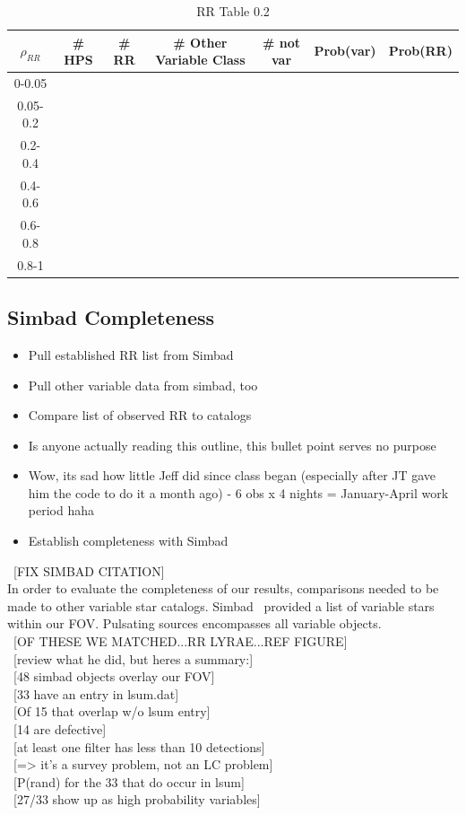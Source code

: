 \documentclass[aps,prb,twocolumn,superscriptaddress]{revtex4-1}
\begin{document}
\begin{table}[H]
	\begin{center}
		\begin{tabular}{ | c | c | c | c | c | c | c | }\hline
		$\rho_{RR}$ & \# HPS & \# RR & \# Other Variable Class & \# not var & Prob(var) & Prob(RR) \\ \hline
		0-0.05 &&&&&& \\ \hline
		0.05-0.2 &&&&&& \\ \hline
		0.2-0.4 &&&&&& \\ \hline
		0.4-0.6 &&&&&& \\ \hline
		0.6-0.8 &&&&&& \\ \hline
		0.8-1 &&&&&& \\ \hline
		\end{tabular}
	\end{center}
\caption{ \small{RR Table 0.2 \label{tab:rrtab}}}
\end{table}

\subsection{Simbad Completeness}
	\begin{itemize}
		\item{} Pull established RR list from Simbad
		\item{} Pull other variable data from simbad, too
		\item{} Compare list of observed RR to catalogs
		\item{} Is anyone actually reading this outline, this bullet point serves no purpose
		\item{} Wow, its sad how little Jeff did since class began (especially after JT gave him the code to do it a month ago) - 6 obs x 4 nights = January-April work period haha
		\item{} Establish completeness with Simbad
	\end{itemize}
~[FIX SIMBAD CITATION]\\
In order to evaluate the completeness of our results, comparisons needed to be made to other variable star catalogs.  Simbad~\cite{simbad} provided a list of variable stars within our FOV.  Pulsating sources encompasses all variable objects.  \\
~[OF THESE WE MATCHED...RR LYRAE...REF FIGURE]\\


~[review what he did, but heres a summary:]\\
~[48 simbad objects overlay our FOV]\\
~[33 have an entry in lsum.dat]\\
~[Of 15 that overlap w/o lsum entry]\\
~[14 are defective]\\
~[at least one filter has less than 10 detections]\\
~[=> it's a survey problem, not an LC problem]\\
~[P(rand) for the 33 that do occur in lsum]\\
~[27/33 show up as high probability variables]\\
\end{document}
